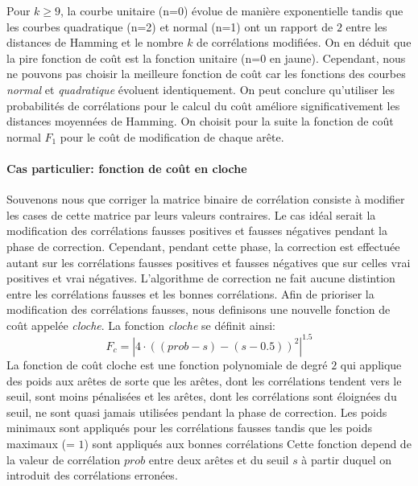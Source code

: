 Pour $k\ge9$, la courbe unitaire (n=0) \'evolue de mani\`ere exponentielle tandis que les courbes quadratique (n=2) et normal (n=1) ont un rapport de $2$ entre les distances de Hamming et le nombre $k$ de corr\'elations modifi\'ees.
On en d\'eduit que la pire fonction de co\^ut est la fonction unitaire (n=0 en jaune).
\newline
Cependant, nous ne pouvons pas choisir la meilleure fonction de co\^ut car les fonctions des courbes {\em normal} et {\em quadratique} \'evoluent identiquement.
 On peut conclure qu'utiliser les probabilit\'es de corr\'elations pour le calcul du co\^ut am\'eliore significativement les distances moyenn\'ees de Hamming.
 \newline
 On choisit pour la suite la fonction de co\^ut normal $F_1$ pour le co\^ut de modification de chaque ar\^ete. 

\paragraph{Cas particulier: fonction de co\^ut en cloche}

Souvenons nous que corriger la matrice binaire de corr\'elation consiste \`a modifier les cases de cette matrice par leurs valeurs contraires.
Le cas id\'eal serait la modification des corr\'elations fausses positives et fausses n\'egatives pendant la phase de correction.
Cependant, pendant cette phase, la correction est effectu\'ee autant sur les corr\'elations fausses positives et fausses n\'egatives que sur celles vrai positives et vrai n\'egatives.
L'algorithme de correction ne fait aucune distintion entre les corr\'elations fausses et les bonnes corr\'elations.
Afin de prioriser la modification des corr\'elations fausses, nous definisons une nouvelle fonction de co\^ut appel\'ee {\em cloche}.
\newline
La fonction {\em cloche} se d\'efinit ainsi:
\begin{equation}
	F_c = | 4\cdot((prob-s) - (s-0.5))^2 |^{1.5}  
\end{equation}
La fonction de co\^ut cloche est une fonction polynomiale de degr\'e $2$ qui applique des poids aux ar\^etes de sorte que les ar\^etes, dont les corr\'elations tendent vers le seuil, sont moins p\'enalis\'ees et les ar\^etes, dont les corr\'elations sont \'eloign\'ees du seuil, ne sont quasi jamais utilis\'ees pendant la phase de correction. 
Les poids minimaux sont appliqu\'es pour les corr\'elations fausses tandis que les poids maximaux (= $1$) sont appliqu\'es aux bonnes corr\'elations
Cette fonction depend de la valeur de corr\'elation $prob$ entre deux ar\^etes et du seuil $s$ \`a partir duquel on introduit des corr\'elations erron\'ees.
\newline

